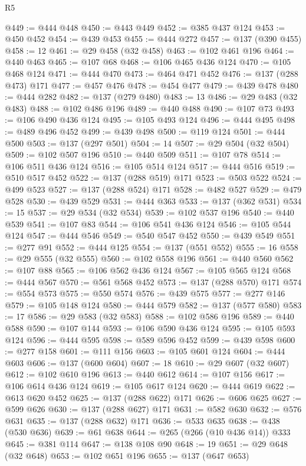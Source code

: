 \begin{lexlean}{R5}
\begin{coremodule}
{{{{{{{{{{{{{{{{{{{{{{{{{{{{{{{{{{{{{{{{{{{{{{{{{{{{{{{{{{{{{{{{{{{{{{{{{{{{{{{{{{{{@449 := @444 @448
@450 := @443 @449
@452 := @385 @437 @124
@453 := @450 @452
@454 := @439 @453
@455 := @444 @272
@457 := @137 (@390 @455)
@458 := 12
@461 := @29 @458 (@32 @458)
@463 := @102 @461 @196
@464 := @440 @463
@465 := @107 @68
@468 := @106 @465 @436 @124
@470 := @105 @468 @124
@471 := @444 @470
@473 := @464 @471 @452
@476 := @137 (@288 @473) @171
@477 := @457 @476
@478 := @454 @477
@479 := @439 @478
@480 := @444 @282
@482 := @137 (@279 @480)
@483 := 13
@486 := @29 @483 (@32 @483)
@488 := @102 @486 @196
@489 := @440 @488
@490 := @107 @73
@493 := @106 @490 @436 @124
@495 := @105 @493 @124
@496 := @444 @495
@498 := @489 @496 @452
@499 := @439 @498
@500 := @119 @124
@501 := @444 @500
@503 := @137 (@297 @501)
@504 := 14
@507 := @29 @504 (@32 @504)
@509 := @102 @507 @196
@510 := @440 @509
@511 := @107 @78
@514 := @106 @511 @436 @124
@516 := @105 @514 @124
@517 := @444 @516
@519 := @510 @517 @452
@522 := @137 (@288 @519) @171
@523 := @503 @522
@524 := @499 @523
@527 := @137 (@288 @524) @171
@528 := @482 @527
@529 := @479 @528
@530 := @439 @529
@531 := @444 @363
@533 := @137 (@362 @531)
@534 := 15
@537 := @29 @534 (@32 @534)
@539 := @102 @537 @196
@540 := @440 @539
@541 := @107 @83
@544 := @106 @541 @436 @124
@546 := @105 @544 @124
@547 := @444 @546
@549 := @540 @547 @452
@550 := @439 @549
@551 := @277 @91
@552 := @444 @125
@554 := @137 (@551 @552)
@555 := 16
@558 := @29 @555 (@32 @555)
@560 := @102 @558 @196
@561 := @440 @560
@562 := @107 @88
@565 := @106 @562 @436 @124
@567 := @105 @565 @124
@568 := @444 @567
@570 := @561 @568 @452
@573 := @137 (@288 @570) @171
@574 := @554 @573
@575 := @550 @574
@576 := @439 @575
@577 := @277 @146
@579 := @105 @148 @124
@580 := @444 @579
@582 := @137 (@577 @580)
@583 := 17
@586 := @29 @583 (@32 @583)
@588 := @102 @586 @196
@589 := @440 @588
@590 := @107 @144
@593 := @106 @590 @436 @124
@595 := @105 @593 @124
@596 := @444 @595
@598 := @589 @596 @452
@599 := @439 @598
@600 := @277 @158
@601 := @111 @156
@603 := @105 @601 @124
@604 := @444 @603
@606 := @137 (@600 @604)
@607 := 18
@610 := @29 @607 (@32 @607)
@612 := @102 @610 @196
@613 := @440 @612
@614 := @107 @156
@617 := @106 @614 @436 @124
@619 := @105 @617 @124
@620 := @444 @619
@622 := @613 @620 @452
@625 := @137 (@288 @622) @171
@626 := @606 @625
@627 := @599 @626
@630 := @137 (@288 @627) @171
@631 := @582 @630
@632 := @576 @631
@635 := @137 (@288 @632) @171
@636 := @533 @635
@638 := @438 (@530 @636)
@639 := @61 @638
@644 := @265 (@266 (@10 @436 @14)) @333
@645 := @381 @114
@647 := @138 @108 @90
@648 := 19
@651 := @29 @648 (@32 @648)
@653 := @102 @651 @196
@655 := @137 (@647 @653)
}}}}}}}}}}}}}}}}}}}}}}}}}}}}}}}}}}}}}}}}}}}}}}}}}}}}}}}}}}}}}}}}}}}}}}}}}}}}}}}}}}}}
\end{coremodule}
\end{lexlean}
